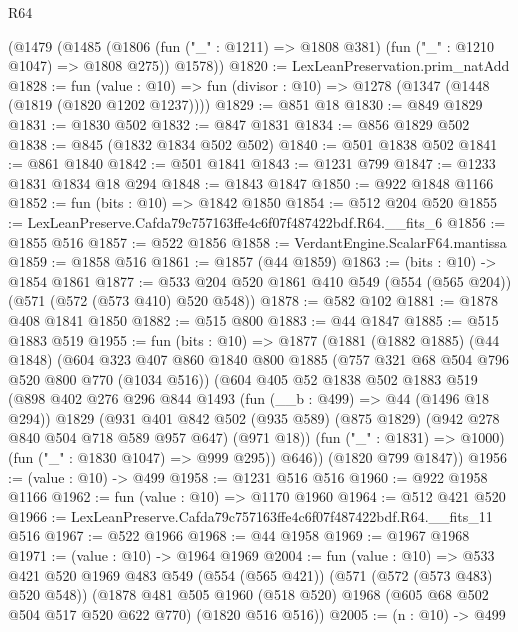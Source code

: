 \begin{lexlean}{R64}
\begin{coremodule}
    (@1479
      (@1485
        (@1806 (fun ("_" : @1211) => @1808 @381) (fun ("_" : @1210 @1047) => @1808 @275))
        @1578))
@1820 := LexLeanPreservation.prim_natAdd
@1828 := fun (value : @10) =>
  fun (divisor : @10) => @1278 (@1347 (@1448 (@1819 (@1820 @1202 @1237))))
@1829 := @851 @18
@1830 := @849 @1829
@1831 := @1830 @502
@1832 := @847 @1831
@1834 := @856 @1829 @502
@1838 := @845 (@1832 @1834 @502 @502)
@1840 := @501 @1838 @502
@1841 := @861 @1840
@1842 := @501 @1841
@1843 := @1231 @799
@1847 := @1233 @1831 @1834 @18 @294
@1848 := @1843 @1847
@1850 := @922 @1848 @1166
@1852 := fun (bits : @10) => @1842 @1850
@1854 := @512 @204 @520
@1855 := LexLeanPreserve.Cafda79c757163ffe4c6f07f487422bdf.R64.__fits_6
@1856 := @1855 @516
@1857 := @522 @1856
@1858 := VerdantEngine.ScalarF64.mantissa
@1859 := @1858 @516
@1861 := @1857 (@44 @1859)
@1863 := (bits : @10) -> @1854 @1861
@1877 := @533 @204 @520 @1861 @410 @549 (@554 (@565 @204)) (@571 (@572 (@573 @410) @520 @548))
@1878 := @582 @102
@1881 := @1878 @408 @1841 @1850
@1882 := @515 @800
@1883 := @44 @1847
@1885 := @515 @1883 @519
@1955 := fun (bits : @10) =>
  @1877
    (@1881
      (@1882 @1885)
      (@44 @1848)
      (@604
        @323
        @407
        @860
        @1840
        @800
        @1885
        (@757 @321 @68 @504 @796 @520 @800 @770 (@1034 @516))
        (@604
          @405
          @52
          @1838
          @502
          @1883
          @519
          (@898
            @402
            @276
            @296
            @844
            @1493
            (fun (__b : @499) => @44 (@1496 @18 @294))
            @1829
            (@931
              @401
              @842
              @502
              (@935 @589)
              (@875 @1829)
              (@942 @278 @840 @504 @718 @589 @957 @647)
              (@971 @18))
            (fun ("_" : @1831) => @1000)
            (fun ("_" : @1830 @1047) => @999 @295))
          @646))
      (@1820 @799 @1847))
@1956 := (value : @10) -> @499
@1958 := @1231 @516 @516
@1960 := @922 @1958 @1166
@1962 := fun (value : @10) => @1170 @1960
@1964 := @512 @421 @520
@1966 := LexLeanPreserve.Cafda79c757163ffe4c6f07f487422bdf.R64.__fits_11 @516
@1967 := @522 @1966
@1968 := @44 @1958
@1969 := @1967 @1968
@1971 := (value : @10) -> @1964 @1969
@2004 := fun (value : @10) =>
  @533
    @421
    @520
    @1969
    @483
    @549
    (@554 (@565 @421))
    (@571 (@572 (@573 @483) @520 @548))
    (@1878
      @481
      @505
      @1960
      (@518 @520)
      @1968
      (@605 @68 @502 @504 @517 @520 @622 @770)
      (@1820 @516 @516))
@2005 := (n : @10) -> @499

\end{coremodule}
\end{lexlean}
